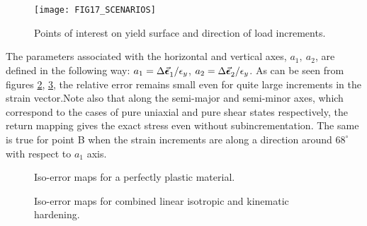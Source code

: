 \begin{figure}[t]
	\centering
	\texttt{[image: FIG17\_SCENARIOS]}
	\caption{Points of interest on yield surface and direction of load 
		increments.}
	\label{fig:FIG17_ISO_MAP_SCENARIOS}
\end{figure}

The parameters associated with the horizontal and vertical axes, $a_1,\ a_2$, 
are defined in the following way: $a_1=\Delta\vec{\bm{\epsilon}}_1^{}/\epsilon_y$, 
$a_2=\Delta\vec{\bm{\epsilon}}_2^{}/\epsilon_y$. As  can be seen from figures 
\ref{fig:FIG18_ISO_MAPS_PERF_PLAST}, \ref{fig:FIG19_ISO_MAPS_HARD}, the 
relative error 
remains small even for quite large increments in the strain vector.Note also 
that along the semi-major and semi-minor axes, which correspond to the cases of 
pure uniaxial and pure shear states respectively, the return mapping gives the 
exact stress 
even without subincrementation. The same is true for point B when the strain 
increments are along a direction around $68^{\circ}$ with respect to $a_1$ axis.

\begin{figure}[b]
	
	\caption{Iso-error maps for a perfectly plastic material.}
	\label{fig:FIG18_ISO_MAPS_PERF_PLAST}
\end{figure} 

\begin{figure}[t]
	
	\caption{Iso-error maps for combined linear isotropic and kinematic 
		hardening.}
	\label{fig:FIG19_ISO_MAPS_HARD}
\end{figure} 

